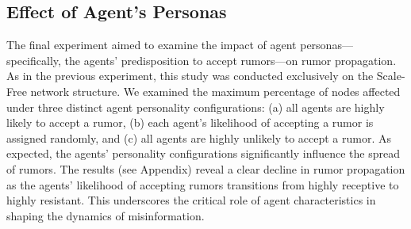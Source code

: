 \subsection{Effect of Agent's Personas}
The final experiment aimed to examine the impact of agent personas—specifically, the agents' predisposition to accept rumors—on rumor propagation.
As in the previous experiment, this study was conducted exclusively on the Scale-Free network structure. 
We examined the maximum percentage of nodes affected under three distinct agent personality configurations: (a) all agents are highly likely to accept a rumor, (b) each agent's likelihood of accepting a rumor is assigned randomly, and (c) all agents are highly unlikely to accept a rumor.
As expected, the agents' personality configurations significantly influence the spread of rumors. 
The results (see Appendix) reveal a clear decline in rumor propagation as the agents' likelihood of accepting rumors transitions from highly receptive to highly resistant. 
This underscores the critical role of agent characteristics in shaping the dynamics of misinformation.




